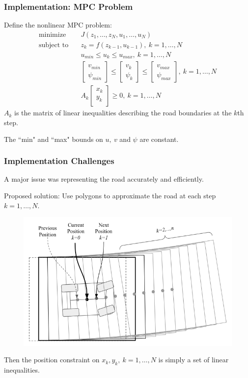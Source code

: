\documentclass{beamer}
\begin{document}
\begin{frame}
\frametitle{Implementation: MPC Problem}
Define the nonlinear MPC problem:
\begin{align}
\text{minimize}\quad& J(z_1,\dots,z_N, u_1,\dots,u_N)
\\
\text{subject to} \quad& z_{k} = f(z_{k-1}, u_{k-1}),\ k=1,\dots,N
\\
& u_{min} \leq u_k \leq u_{max},\ k=1,\dots,N
\\
& \begin{bmatrix}
v_{min}\\\psi_{min}
\end{bmatrix} \leq \begin{bmatrix}
v_k\\\psi_k
\end{bmatrix}\leq \begin{bmatrix}
v_{max}\\\psi_{max}
\end{bmatrix},\ k=1,\dots,N
\\
&
A_k\begin{bmatrix}
x_k\\y_k\\
\end{bmatrix} \geq 0,\ k=1,\dots,N
\end{align}
$A_k$ is the matrix of linear inequalities describing the road boundaries at the $k$th step.

The ``min" and ``max" bounds on $u,\ v$ and $\psi$ are constant.
\end{frame}

\begin{frame}
\frametitle{Implementation Challenges}
A major issue was representing the road accurately and efficiently.

Proposed solution: Use polygons to approximate the road at each step  $k=1,\dots,N$.
\vspace{-0.5em}
\begin{figure}
\includegraphics[width=0.7\linewidth]{road_polygons.png}
\end{figure}
\vspace{-0.5em}
Then the position constraint on $x_k,y_k,\ k=1,\dots,N$ is simply a set of linear inequalities.
\end{frame}
\end{document}
